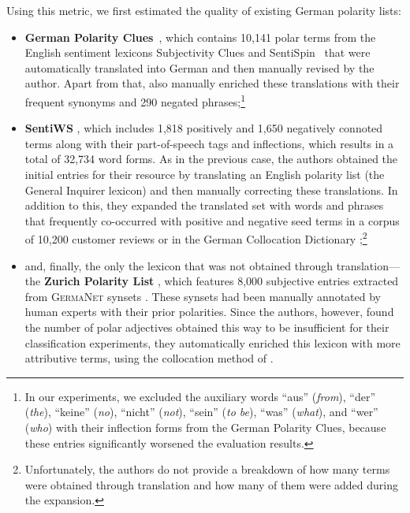 Using this metric, we first estimated the quality of existing German
polarity lists:
\begin{itemize}
\item\textbf{German Polarity Clues}~\cite[GPC;][]{Waltinger:10}, which
  contains 10,141 polar terms from the English sentiment lexicons
  Subjectivity Clues \cite{Wilson:05} and SentiSpin~\cite{Takamura:05}
  that were automatically translated into German and then manually
  revised by the author.  Apart from that, \citeauthor{Waltinger:10}
  also manually enriched these translations with their frequent
  synonyms and 290 negated phrases;\footnote{In our experiments, we
    excluded the auxiliary words ``aus'' (\emph{from}), ``der''
    (\emph{the}), ``keine'' (\emph{no}), ``nicht'' (\emph{not}),
    ``sein'' (\emph{to be}), ``was'' (\emph{what}), and ``wer''
    (\emph{who}) with their inflection forms from the German Polarity
    Clues, because these entries significantly worsened the evaluation
    results.}

\item\textbf{SentiWS} \cite[SWS;][]{Remus:10}, which includes 1,818
  positively and 1,650 negatively connoted terms along with their
  part-of-speech tags and inflections, which results in a total of
  32,734 word forms.  As in the previous case, the authors obtained
  the initial entries for their resource by translating an English
  polarity list (the General Inquirer lexicon) and then manually
  correcting these translations.  In addition to this, they expanded
  the translated set with words and phrases that frequently
  co-occurred with positive and negative seed terms in a corpus of
  10,200 customer reviews or in the German Collocation Dictionary
  \cite{Quasthoff:10};\footnote{Unfortunately, the authors do not
    provide a breakdown of how many terms were obtained through
    translation and how many of them were added during the expansion.}

\item and, finally, the only the lexicon that was not obtained through
  translation---the \textbf{Zurich Polarity List}
  \cite[ZPL;][]{Clematide:10}, which features 8,000 subjective entries
  extracted from \textsc{GermaNet} synsets \cite{Hamp:97}.  These
  synsets had been manually annotated by human experts with their
  prior polarities.  Since the authors, however, found the number of
  polar adjectives obtained this way to be insufficient for their
  classification experiments, they automatically enriched this lexicon
  with more attributive terms, using the collocation method of
  \citet{Hatzivassi:97}.
\end{itemize}

